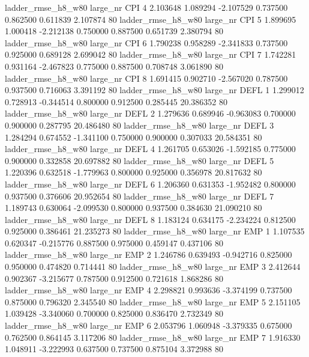  ladder_rmse_h8_w80   large_nr      CPI                 4  2.103648  1.089294  -2.107529 0.737500 0.862500  0.611839    2.107874 80
 ladder_rmse_h8_w80   large_nr      CPI                 5  1.899695  1.000418  -2.212138 0.750000 0.887500  0.651739    2.380794 80
 ladder_rmse_h8_w80   large_nr      CPI                 6  1.790238  0.958289  -2.341833 0.737500 0.925000  0.689128    2.699042 80
 ladder_rmse_h8_w80   large_nr      CPI                 7  1.742281  0.931164  -2.467823 0.775000 0.887500  0.708748    3.061890 80
 ladder_rmse_h8_w80   large_nr      CPI                 8  1.691415  0.902710  -2.567020 0.787500 0.937500  0.716063    3.391192 80
 ladder_rmse_h8_w80   large_nr     DEFL                 1  1.299012  0.728913  -0.344514 0.800000 0.912500  0.285445   20.386352 80
 ladder_rmse_h8_w80   large_nr     DEFL                 2  1.279636  0.689946  -0.963083 0.700000 0.900000  0.287795   20.486480 80
 ladder_rmse_h8_w80   large_nr     DEFL                 3  1.284294  0.674552  -1.341100 0.750000 0.900000  0.307033   20.584351 80
 ladder_rmse_h8_w80   large_nr     DEFL                 4  1.261705  0.653026  -1.592185 0.775000 0.900000  0.332858   20.697882 80
 ladder_rmse_h8_w80   large_nr     DEFL                 5  1.220396  0.632518  -1.779963 0.800000 0.925000  0.356978   20.817632 80
 ladder_rmse_h8_w80   large_nr     DEFL                 6  1.206360  0.631353  -1.952482 0.800000 0.937500  0.376606   20.952654 80
 ladder_rmse_h8_w80   large_nr     DEFL                 7  1.189743  0.630064  -2.099530 0.800000 0.937500  0.384630   21.090210 80
 ladder_rmse_h8_w80   large_nr     DEFL                 8  1.183124  0.634175  -2.234224 0.812500 0.925000  0.386461   21.235273 80
 ladder_rmse_h8_w80   large_nr      EMP                 1  1.107535  0.620347  -0.215776 0.887500 0.975000  0.459147    0.437106 80
 ladder_rmse_h8_w80   large_nr      EMP                 2  1.246786  0.639493  -0.942716 0.825000 0.950000  0.474820    0.714441 80
 ladder_rmse_h8_w80   large_nr      EMP                 3  2.412644  0.902367  -3.215677 0.787500 0.912500  0.721618    1.868286 80
 ladder_rmse_h8_w80   large_nr      EMP                 4  2.298821  0.993636  -3.374199 0.737500 0.875000  0.796320    2.345540 80
 ladder_rmse_h8_w80   large_nr      EMP                 5  2.151105  1.039428  -3.340060 0.700000 0.825000  0.836470    2.732349 80
 ladder_rmse_h8_w80   large_nr      EMP                 6  2.053796  1.060948  -3.379335 0.675000 0.762500  0.864145    3.117206 80
 ladder_rmse_h8_w80   large_nr      EMP                 7  1.916330  1.048911  -3.222993 0.637500 0.737500  0.875104    3.372988 80
